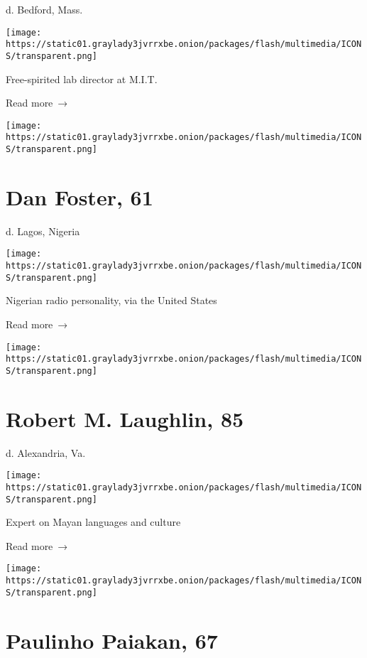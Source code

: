d. Bedford, Mass.

\texttt{[image: https://static01.graylady3jvrrxbe.onion/packages/flash/multimedia/ICONS/transparent.png]}

Free-spirited lab director at M.I.T.

 Read more~→

\href{https://www.nytimes3xbfgragh.onion/2020/06/24/obituaries/dan-foster-dead-coronavirus.html}{}

\texttt{[image: https://static01.graylady3jvrrxbe.onion/packages/flash/multimedia/ICONS/transparent.png]}

\hypertarget{dan-foster-61}{%
\section{Dan Foster, 61}\label{dan-foster-61}}

d. Lagos, Nigeria

\texttt{[image: https://static01.graylady3jvrrxbe.onion/packages/flash/multimedia/ICONS/transparent.png]}

Nigerian radio personality, via the United States

 Read more~→

\href{https://www.nytimes3xbfgragh.onion/2020/06/24/science/robert-laughlin-preserver-of-a-mayan-language-dies-at-85.html}{}

\texttt{[image: https://static01.graylady3jvrrxbe.onion/packages/flash/multimedia/ICONS/transparent.png]}

\hypertarget{robert-m-laughlin-85}{%
\section{Robert M. Laughlin, 85}\label{robert-m-laughlin-85}}

d. Alexandria, Va.

\texttt{[image: https://static01.graylady3jvrrxbe.onion/packages/flash/multimedia/ICONS/transparent.png]}

Expert on Mayan languages and culture

 Read more~→

\href{https://www.nytimes3xbfgragh.onion/2020/06/23/obituaries/paulinho-paiakan-dead-indigenous-activist.html}{}

\texttt{[image: https://static01.graylady3jvrrxbe.onion/packages/flash/multimedia/ICONS/transparent.png]}

\hypertarget{paulinho-paiakan-67}{%
\section{Paulinho Paiakan, 67}\label{paulinho-paiakan-67}}

